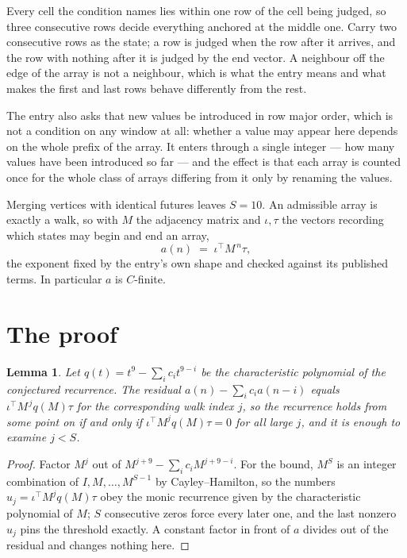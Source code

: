 \documentclass[11pt,a4paper]{article}
\theoremstyle{plain}
\newtheorem{lemma}[theorem]{Lemma}
\theoremstyle{definition}
\begin{document}
Every cell the condition names lies within one row of the cell being judged, so three consecutive rows decide everything anchored at the middle one. Carry two consecutive rows as the state; a row is judged when the row after it arrives, and the row with nothing after it is judged by the end vector. A neighbour off the edge of the array is not a neighbour, which is what the entry means and what makes the first and last rows behave differently from the rest.

The entry also asks that new values be introduced in row major order, which is not a condition on any window at all: whether a value may appear here depends on the whole prefix of the array. It enters through a single integer --- how many values have been introduced so far --- and the effect is that each array is counted once for the whole class of arrays differing from it only by renaming the values.

Merging vertices with identical futures leaves $S=10$. An admissible array is exactly a walk, so with $M$ the adjacency matrix and $\iota,\tau$ the vectors recording which states may begin and end an array,
\[
a(n)\;=\;\iota^{\!\top}M^{\,n}\tau ,
\]
the exponent fixed by the entry's own shape and checked against its published terms. In
particular $a$ is $C$-finite.

\section{The proof}

\begin{lemma}\label{lem:crit}
Let $q(t)=t^{9}-\sum_i c_it^{9-i}$ be the characteristic polynomial of the
conjectured recurrence. The residual $a(n)-\sum_ic_ia(n-i)$ equals
$\iota^{\!\top}M^{\,j}q(M)\tau$ for the corresponding walk index $j$, so the recurrence
holds from some point on if and only if $\iota^{\!\top}M^{j}q(M)\tau=0$ for all large $j$,
and it is enough to examine $j<S$.
\end{lemma}

\begin{proof}
Factor $M^{j}$ out of $M^{j+9}-\sum_ic_iM^{j+9-i}$. For the bound, $M^{S}$
is an integer combination of $I,M,\dots,M^{S-1}$ by Cayley--Hamilton, so the numbers
$u_j=\iota^{\!\top}M^{j}q(M)\tau$ obey the monic recurrence given by the characteristic
polynomial of $M$; $S$ consecutive zeros force every later one, and the last nonzero $u_j$
pins the threshold exactly. A constant factor in front of $a$ divides out of the residual and
changes nothing here.
\end{proof}
\end{document}
